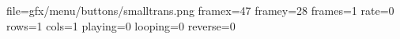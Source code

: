 file=gfx/menu/buttons/smalltrans.png
framex=47
framey=28
frames=1
rate=0
rows=1
cols=1
playing=0
looping=0
reverse=0